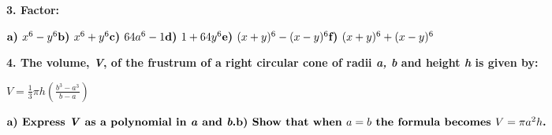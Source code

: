 \documentclass[14pt, a4paper]{extarticle}
\begin{document}
\textbf{3. Factor:} \\
\begin{adjustwidth}{1cm}{0pt}
    \begin{math}
        \textbf{a) $x^6 - y^6$} \\
        \\
        \textbf{b) $x^6 + y^6$} \\
        \\
        \textbf{c) $64a^6 - 1$} \\
        \\
        \textbf{d) $1 + 64y^6$} \\
        \\
        \textbf{e) $(x + y)^6 - (x - y)^6$} \\
        \\
        \textbf{f) $(x + y)^6 + (x - y)^6$} \\
        \\
    \end{math}
\end{adjustwidth}

\textbf{4. The volume, \emph{V}, of the frustrum of a right circular cone of radii \emph{a, b} 
and height \emph{h} is given by:}
\begin{center}
    \textbf{$V = \frac{1}{3}\pi h (\frac{b^3 - a^3}{b - a})$}
\end{center}
\begin{adjustwidth}{1cm}{0pt}
    \begin{math}
        \textbf{a) Express \emph{V} as a polynomial in \emph{a} and \emph{b}.} \\
        \\
        \textbf{b) Show that when \emph{$a = b$} the formula becomes \emph{$V = \pi a^2 h$}.} \\
    \end{math}
\end{adjustwidth}
\end{document}
